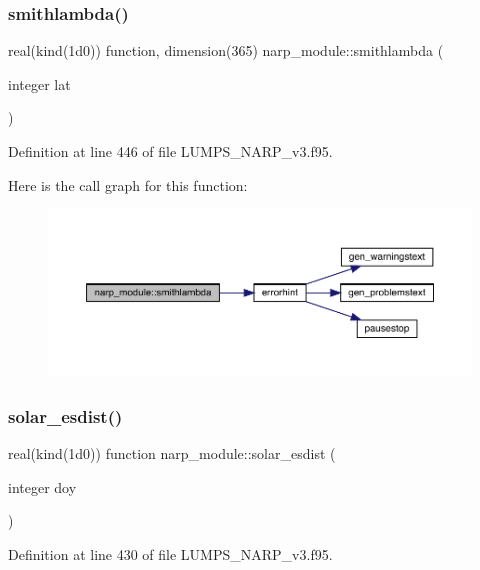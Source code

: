 \subsubsection{\texorpdfstring{smithlambda()}{smithlambda()}}
{\footnotesize\ttfamily real(kind(1d0)) function, dimension(365) narp\+\_\+module\+::smithlambda (\begin{DoxyParamCaption}\item[{integer}]{lat }\end{DoxyParamCaption})}



Definition at line 446 of file L\+U\+M\+P\+S\+\_\+\+N\+A\+R\+P\+\_\+v3.\+f95.

Here is the call graph for this function\+:\nopagebreak
\begin{figure}[H]
\begin{center}
\leavevmode
\includegraphics[width=350pt]{namespacenarp__module_a2855b93202c40f690a05a6febcdc8067_cgraph}
\end{center}
\end{figure}
\mbox{\label{namespacenarp__module_ada3ea94f7e9dc6f9fc5bc22c4b1d8a68}} 
\subsubsection{\texorpdfstring{solar\+\_\+esdist()}{solar\_esdist()}}
{\footnotesize\ttfamily real(kind(1d0)) function narp\+\_\+module\+::solar\+\_\+esdist (\begin{DoxyParamCaption}\item[{integer}]{doy }\end{DoxyParamCaption})}



Definition at line 430 of file L\+U\+M\+P\+S\+\_\+\+N\+A\+R\+P\+\_\+v3.\+f95.

